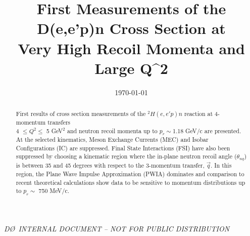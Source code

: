 \documentclass[aps,prl,twocolumn,showpacs,superscriptaddress,groupedaddress]{revtex4-2}  %
\begin{document}
\widetext
{}
\centerline{\em D\O\ INTERNAL DOCUMENT -- NOT FOR PUBLIC DISTRIBUTION}


\title{First Measurements of the D(e,e'p)n Cross Section at \\ Very High Recoil Momenta and Large Q^{2}}
\date{\today}


\begin{abstract}
  First results of cross section measurements of the $^{2}H(e,e'p)n$ reaction at 4-momentum transfers \\ 4 $\leq Q^{2}\leq$ 5 GeV$^{2}$ and
  neutron recoil momenta up to $p_{r}\sim$1.18 GeV/c are presented. At the selected kinematics, Meson Exchange Currents (MEC) and Isobar
  Configurations (IC) are suppressed. Final State Interactions (FSI) have also been suppressed by choosing a kinematic region where the in-plane neutron recoil
  angle ($\theta_{nq}$) is between 35 and 45 degrees with respect to the 3-momentum transfer, $\vec{q}$. In this region, the Plane Wave Impulse Approximation (PWIA)
  dominates and comparison to recent theoretical calculations show data to be sensitive to momentum distributions up to $p_{r}\sim$ 750 MeV/c.
  
  
  
\end{abstract}
\end{document}
